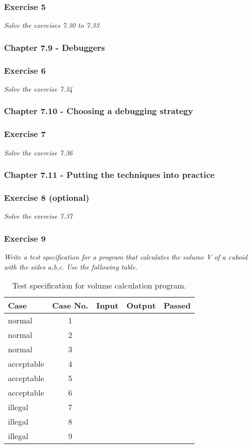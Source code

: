 \subsubsection*{Exercise 5}
\textit{Solve the exercises 7.30 to 7.33} \\


\subsubsection{Chapter 7.9 - Debuggers}

\subsubsection*{Exercise 6}
\textit{Solve the exercise 7.34} \\

\subsubsection{Chapter 7.10 - Choosing a debugging strategy}

\subsubsection*{Exercise 7}
\textit{Solve the exercise 7.36}

\subsubsection{Chapter 7.11 - Putting the techniques into practice}

\subsubsection*{Exercise 8 (optional)}
\textit{Solve the exercise 7.37}

\subsubsection*{Exercise 9}
\textit{Write a test specification for a program that calculates the volume V
of a cuboid with the sides a,b,c. Use the following table.}

\begin{table}
	\centering
	\begin{tabular}{l c p{4cm} p{4cm} c}
	Case & Case No. & Input & Output & Passed \\
	\hline
	normal 		& 1 & & & \\
	normal 		& 2 & & & \\
	normal 		& 3 & & & \\
	acceptable 	& 4 & & & \\
	acceptable 	& 5 & & & \\
	acceptable 	& 6 & & & \\
	illegal 	& 7 & & & \\
	illegal 	& 8 & & & \\
	illegal 	& 9 & & & \\
	\end{tabular}
	\caption{Test specification for volume calculation program.}
	\label{table:test-specification}
\end{table}

